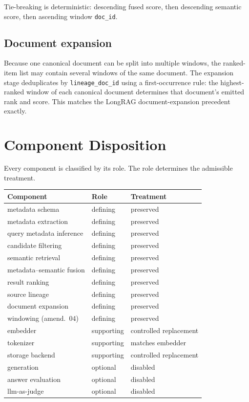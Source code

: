 \documentclass[11pt,a4paper]{article}
\begin{document}
Tie-breaking is deterministic: descending fused score, then
descending semantic score, then ascending window \texttt{doc\_id}.

\subsection{Document expansion}
Because one canonical document can be split into multiple windows,
the ranked-item list may contain several windows of the same
document. The expansion stage deduplicates by \texttt{lineage\_doc\_id}
using a first-occurrence rule: the highest-ranked window of each
canonical document determines that document's emitted rank and score.
This matches the LongRAG document-expansion precedent exactly.

\section{Component Disposition}\label{sec:disposition}

Every component is classified by its role. The role determines the
admissible treatment.

\begin{center}
\small
\begin{tabular}{lll}
\toprule
\textbf{Component} & \textbf{Role} & \textbf{Treatment} \\
\midrule
metadata schema & defining & preserved \\
metadata extraction & defining & preserved \\
query metadata inference & defining & preserved \\
candidate filtering & defining & preserved \\
semantic retrieval & defining & preserved \\
metadata--semantic fusion & defining & preserved \\
result ranking & defining & preserved \\
source lineage & defining & preserved \\
document expansion & defining & preserved \\
windowing (amend.~04) & defining & preserved \\
embedder & supporting & controlled replacement \\
tokenizer & supporting & matches embedder \\
storage backend & supporting & controlled replacement \\
generation & optional & disabled \\
answer evaluation & optional & disabled \\
llm-as-judge & optional & disabled \\
\bottomrule
\end{tabular}
\end{center}
\end{document}
